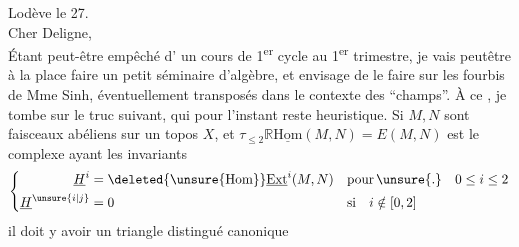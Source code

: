 
\noindent\hfill Lodève le 27.\\
Cher Deligne,\\
Étant peut-être empêché   d' un cours de 1\textsuperscript{er} cycle au 1\textsuperscript{er} trimestre, je vais peutêtre à la place faire un petit séminaire d'algèbre, et envisage de le faire sur les fourbis de Mme Sinh, éventuellement transposés dans le contexte des ``champs''. À ce , je tombe sur le truc suivant, qui pour l'instant reste heuristique. Si $M,N$ sont  faisceaux abéliens sur un topos $X$, et $\tau_{\leq 2}\mathbb{R}\underline{\mathrm{Hom}}(M,N)=E(M,N)$ est le complexe ayant les invariants
\[
\left\{\begin{aligned}
\underline{H}^{i} &= \deleted{\unsure{\mathrm{Hom}}}\underline{\mathrm{Ext}}^{i}(M,N) && \text{pour}\,\unsure{.}\quad 0\leq i\leq 2\\
\underline{H}^{\unsure{i|j}} &= 0 && \text{si}\quad i\notin[0,2]
\end{aligned}\right.
\]
il doit y avoir un triangle distingué canonique

